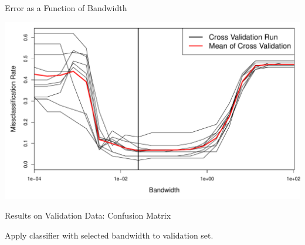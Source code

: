 \documentclass[12pt]{beamer}
\begin{document}
\begin{frame}{Error as a Function of Bandwidth}

  \begin{center}
    \includegraphics[scale=0.4]{figs/kde_cv.pdf}
  \end{center}
  
\end{frame}



\begin{frame}{Results on Validation Data: Confusion Matrix}

Apply classifier with selected bandwidth to validation set.
  
\begin{center}

\end{center}

  
\end{frame}
\end{document}

